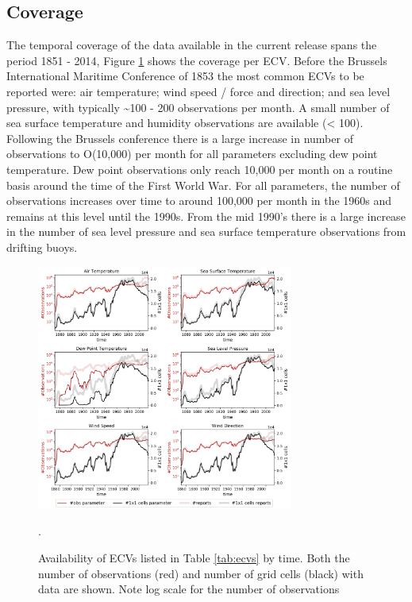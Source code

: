\subsection{Coverage}
The temporal coverage of the data available in the current release spans the period 1851 - 2014, Figure \ref{fig:ecv_ts1} shows the coverage per ECV.
Before the Brussels International Maritime Conference of 1853 the most common ECVs to be reported were: air temperature; wind speed / force and direction; and sea level pressure, with typically \sim 100 - 200 observations per month. 
A small number of sea surface temperature and humidity observations are available (< 100).
Following the Brussels conference there is a large increase in number of observations to O(10,000) per month for all parameters excluding dew point temperature. 
Dew point observations only reach 10,000 per month on a routine basis around the time of the First World War.
For all parameters, the number of observations increases over time to around 100,000 per month in the 1960s and remains at this level until the 1990s.
From the mid 1990's there is a large increase in the number of sea level pressure and sea surface temperature observations from drifting buoys.

\begin{figure}[h]
\centering
    \includegraphics[width=0.75\textwidth]{resources/ecv_coverage_ts_grid.png}
    \caption{Availability of ECVs listed in Table \ref{tab:ecvs} by time. Both the number of observations (red) and number of grid cells (black) with data are shown. Note log scale for the number of observations}.
    \label{fig:ecv_ts1}
\end{figure}

